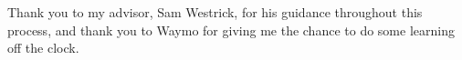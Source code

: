 
Thank you to my advisor, Sam Westrick, for his guidance throughout this process,
and thank you to Waymo for giving me the chance to do some learning off the
clock.
